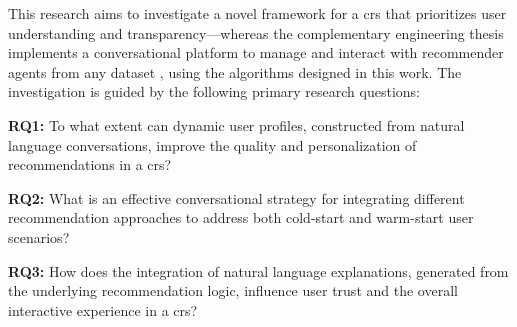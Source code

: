 This research aims to investigate a novel framework for a \ac{crs} that prioritizes user understanding and transparency---whereas the complementary engineering thesis implements a conversational platform to manage and interact with recommender agents from any dataset \cite{MUII-THESIS}, using the algorithms designed in this work. The investigation is guided by the following primary research questions:

\begin{compactenum}
    \item[\textbf{RQ1:}] To what extent can dynamic user profiles, constructed from natural language conversations, improve the quality and personalization of recommendations in a \ac{crs}?
    \item[\textbf{RQ2:}] What is an effective conversational strategy for integrating different recommendation approaches to address both cold-start and warm-start user scenarios?
    \item[\textbf{RQ3:}] How does the integration of natural language explanations, generated from the underlying recommendation logic, influence user trust and the overall interactive experience in a \ac{crs}?
\end{compactenum}